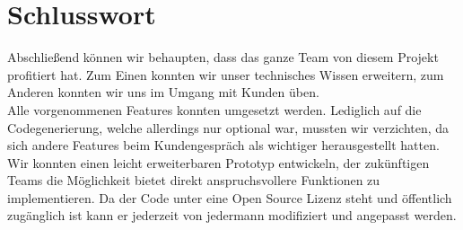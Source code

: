 \section{Schlusswort}
Abschließend können wir behaupten, dass das ganze Team von diesem Projekt profitiert hat. Zum Einen konnten
wir unser technisches Wissen erweitern, zum Anderen konnten wir uns im Umgang mit Kunden üben.\\
Alle vorgenommenen Features konnten umgesetzt werden. Lediglich auf die Codegenerierung, welche allerdings
nur optional war, mussten wir verzichten, da sich andere Features beim Kundengespräch als wichtiger herausgestellt
hatten.\\
Wir konnten einen leicht erweiterbaren Prototyp entwickeln, der zukünftigen Teams die Möglichkeit bietet direkt
anspruchsvollere Funktionen zu implementieren. Da der Code unter eine Open Source Lizenz steht und öffentlich
zugänglich ist kann er jederzeit von jedermann modifiziert und angepasst werden.
